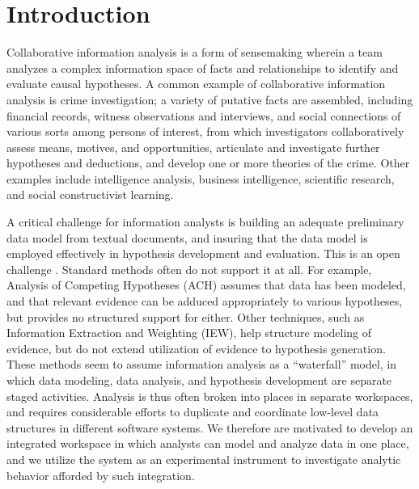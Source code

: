 
\section{Introduction}\label{introduction}

Collaborative information analysis is a form of sensemaking wherein a
team analyzes a complex information space of facts and relationships to
identify and evaluate causal hypotheses. A common example of
collaborative information analysis is crime investigation; a variety of
putative facts are assembled, including financial records, witness
observations and interviews, and social connections of various sorts
among persons of interest, from which investigators collaboratively
assess means, motives, and opportunities, articulate and investigate
further hypotheses and deductions, and develop one or more theories of
the crime. Other examples include intelligence analysis, business
intelligence, scientific research, and social constructivist learning.

A critical challenge for information analysts is building an adequate
preliminary data model from textual documents, and insuring that the
data model is employed effectively in hypothesis development and
evaluation. This is an open challenge \autocite{Badalamente2005}.
Standard methods often do not support it at all. For example, Analysis
of Competing Hypotheses (ACH) assumes that data has been modeled, and
that relevant evidence can be adduced appropriately to various
hypotheses, but provides no structured support for either. Other
techniques, such as Information Extraction and Weighting (IEW), help
structure modeling of evidence, but do not extend utilization of
evidence to hypothesis generation. These methods seem to assume
information analysis as a ``waterfall'' model, in which data modeling,
data analysis, and hypothesis development are separate staged
activities. Analysis is thus often broken into places in separate
workspaces, and requires considerable efforts to duplicate and
coordinate low-level data structures in different software systems. We
therefore are motivated to develop an integrated workspace in which
analysts can model and analyze data in one place, and we utilize the
system as an experimental instrument to investigate analytic behavior
afforded by such integration.

